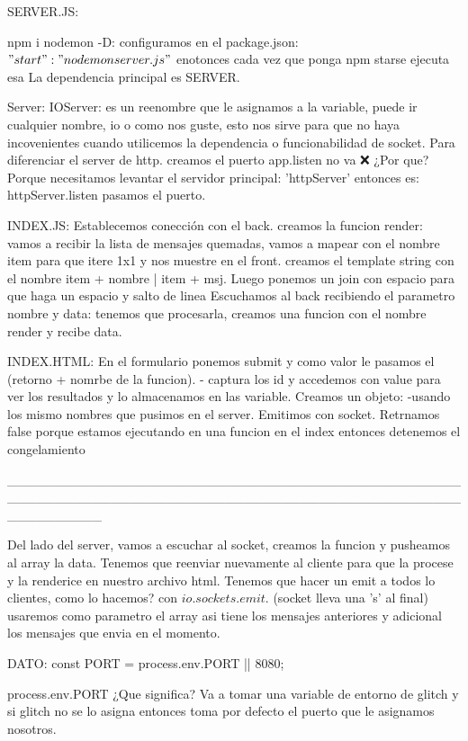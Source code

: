 SERVER.JS:

npm i nodemon -D: configuramos en el package.json: $"start": "nodemon server.js"$  enotonces cada vez que ponga npm starse ejecuta esa
La dependencia principal es SERVER.

Server: IOServer: es un reenombre que le asignamos a la variable, puede ir cualquier nombre, io o como nos guste, esto nos sirve para que no haya
incovenientes cuando utilicemos la dependencia o funcionabilidad de socket. Para diferenciar el server de http.
creamos el puerto
app.listen no va ❌ ¿Por que? Porque necesitamos levantar el servidor principal: 'httpServer' entonces es: httpServer.listen
pasamos el puerto.

INDEX.JS:
Establecemos conección con el back.
creamos la funcion render: vamos a recibir la lista de mensajes quemadas, vamos a mapear con el nombre item para que itere 1x1 y nos muestre en el front.
creamos el template string con el nombre item + nombre | item + msj. Luego ponemos un join con espacio para que haga un espacio y salto de linea 
Escuchamos al back recibiendo el parametro nombre y data: tenemos que procesarla, creamos una funcion con el nombre render y recibe data.

INDEX.HTML: 
En el formulario ponemos submit y como valor le pasamos el (retorno + nomrbe de la funcion).
- captura los id y accedemos con value para ver los resultados y lo almacenamos en las variable.
Creamos un objeto:
-usando los mismo nombres que pusimos en el server. 
Emitimos con socket.
Retrnamos false porque estamos ejecutando en una funcion en el index entonces detenemos el congelamiento

__________________________________________________________________________________________________________

Del lado del server, vamos a escuchar al socket, creamos la funcion y pusheamos al array la data.
Tenemos que reenviar nuevamente al cliente para que la procese y la renderice en nuestro archivo html.
Tenemos que hacer un emit a todos lo clientes, como lo hacemos? con $io.sockets.emit$. (socket lleva una 's' al final)
usaremos como parametro el array asi tiene los mensajes anteriores y adicional los mensajes que envia en el momento.

DATO:
const PORT = process.env.PORT || 8080;

process.env.PORT ¿Que significa?
Va a tomar una variable de entorno de glitch y si glitch no se lo asigna entonces toma por defecto el puerto que le asignamos nosotros.

